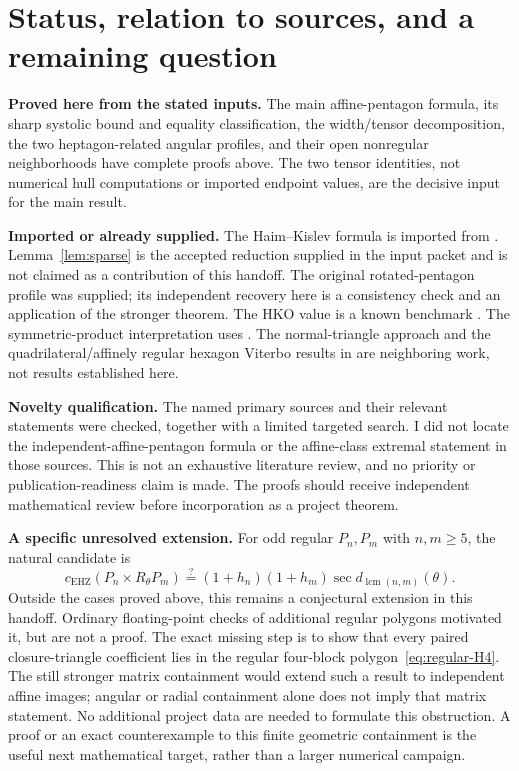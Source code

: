 \documentclass[11pt,a4paper]{article}
\theoremstyle{definition}\newtheorem{definition}[theorem]{Definition}
\theoremstyle{remark}\newtheorem{remark}[theorem]{Remark}
\newcommand{\capc}{c_{\mathrm{EHZ}}}
\begin{document}
\section{Status, relation to sources, and a remaining question}\label{sec:status}
\textbf{Proved here from the stated inputs.} The main affine-pentagon formula, its sharp systolic bound and equality classification, the width/tensor decomposition, the two heptagon-related angular profiles, and their open nonregular neighborhoods have complete proofs above. The two tensor identities, not numerical hull computations or imported endpoint values, are the decisive input for the main result.

\textbf{Imported or already supplied.} The Haim--Kislev formula is imported from \cite{HK}. Lemma~\ref{lem:sparse} is the accepted reduction supplied in the input packet and is not claimed as a contribution of this handoff. The original rotated-pentagon profile was supplied; its independent recovery here is a consistency check and an application of the stronger theorem. The HKO value is a known benchmark \cite{HKO}. The symmetric-product interpretation uses \cite{AAKO}. The normal-triangle approach and the quadrilateral/affinely regular hexagon Viterbo results in \cite{BMP} are neighboring work, not results established here.

\textbf{Novelty qualification.} The named primary sources and their relevant statements were checked, together with a limited targeted search. I did not locate the independent-affine-pentagon formula or the affine-class extremal statement in those sources. This is not an exhaustive literature review, and no priority or publication-readiness claim is made. The proofs should receive independent mathematical review before incorporation as a project theorem.

\textbf{A specific unresolved extension.} For odd regular $P_n,P_m$ with $n,m\ge5$, the natural candidate is
\[
 \capc(P_n\times R_\theta P_m)
 \stackrel{?}{=}(1+h_n)(1+h_m)\sec d_{\operatorname{lcm}(n,m)}(\theta).
\]
Outside the cases proved above, this remains a conjectural extension in this handoff. Ordinary floating-point checks of additional regular polygons motivated it, but are not a proof. The exact missing step is to show that every paired closure-triangle coefficient lies in the regular four-block polygon~\eqref{eq:regular-H4}. The still stronger matrix containment would extend such a result to independent affine images; angular or radial containment alone does not imply that matrix statement. No additional project data are needed to formulate this obstruction. A proof or an exact counterexample to this finite geometric containment is the useful next mathematical target, rather than a larger numerical campaign.
\end{document}
